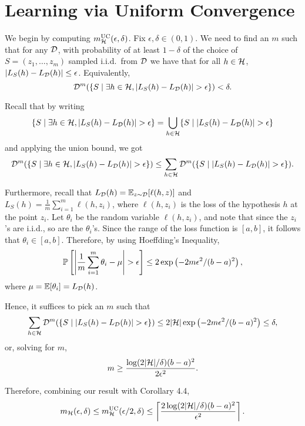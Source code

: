 \chapter{Learning via Uniform Convergence}

\begin{ex}
\end{ex}

\begin{ex}
  We begin by computing $m^{\text{UC}}_{\mathcal{H}}(\epsilon, \delta)$. Fix
  $\epsilon,\delta\in (0, 1)$. We need to find an $m$ such that for any
  $\mathcal{D}$, with probability of at least $1-\delta$ of the choice of
  $S=(z_1,\ldots,z_m)$ sampled i.i.d.\ from $\mathcal{D}$ we have that for all $h\in\mathcal{H}$,
  $|L_S(h)-L_{\mathcal{D}}(h)|\leq \epsilon$. Equivalently,
  \[
    \mathcal{D}^m(\{S \mid \exists h\in\mathcal{H}, |L_S(h)-L_{\mathcal{D}}(h)| > \epsilon \})< \delta.
  \]

  Recall that by writing
  \[
    \{S \mid \exists h\in\mathcal{H}, |L_S(h)-L_{\mathcal{D}}(h)| > \epsilon \}
    =\bigcup_{h\in\mathcal{H}}\{S \mid |L_S(h)-L_{\mathcal{D}}(h)| > \epsilon \}
  \]
  and applying the union bound, we got
  \[
    \mathcal{D}^m(\{S \mid \exists h\in\mathcal{H}, |L_S(h)-L_{\mathcal{D}}(h)| > \epsilon \})
    \leq \sum_{h\in\mathcal{H}}\mathcal{D}^m(\{S \mid |L_S(h)-L_{\mathcal{D}}(h)| > \epsilon \}).
  \]

  Furthermore, recall that $L_{\mathcal{D}}(h)=\mathbb{E}_{z\sim \mathcal{D}}[\ell(h,z)]$ and
  $L_S(h)=\frac{1}{m}\sum_{i=1}^m \ell(h,z_i)$, where $\ell(h, z_i)$ is the loss
  of the hypothesis $h$ at the point $z_i$.
  Let $\theta_i$ be the random variable $\ell(h, z_i)$, and note that since the
  $z_i$'s are i.i.d., so are the $\theta_i$'s. Since the range of the loss
  function is $[a, b]$, it follows that $\theta_i\in [a, b]$. Therefore, by
  using Hoeffding's Inequality,
  \[
    \P\left[\left|\frac{1}{m}\sum_{i=1}^m \theta_i-\mu\right|>\epsilon\right]
    \leq 2\exp\left(-2m\epsilon^2/(b-a)^2 \right),
  \]
  where $\mu=\mathbb{E}[\theta_i]=L_{\mathcal{D}}(h)$.

  Hence, it suffices to pick an $m$ such that
  \[
    \sum_{h\in\mathcal{H}}\mathcal{D}^m(\{S \mid |L_S(h)-L_{\mathcal{D}}(h)| > \epsilon \})
    \leq 2|\mathcal{H}|\exp\left(-2m\epsilon^2/(b-a)^2 \right)\leq \delta,
  \]
  or, solving for $m$,
  \[
    m \geq \frac{\log(2|\mathcal{H}|/\delta)(b-a)^2}{2\epsilon^2}.
  \]

  Therefore, combining our result with Corollary 4.4,
  \[
    m_{\mathcal{H}}(\epsilon, \delta)
    \leq m^{\text{UC}}_{\mathcal{H}}(\epsilon/2, \delta)
    \leq \left\lceil
    \frac{2\log(2|\mathcal{H}|/\delta)(b-a)^2}{\epsilon^2}
    \right\rceil.
  \]
\end{ex}
